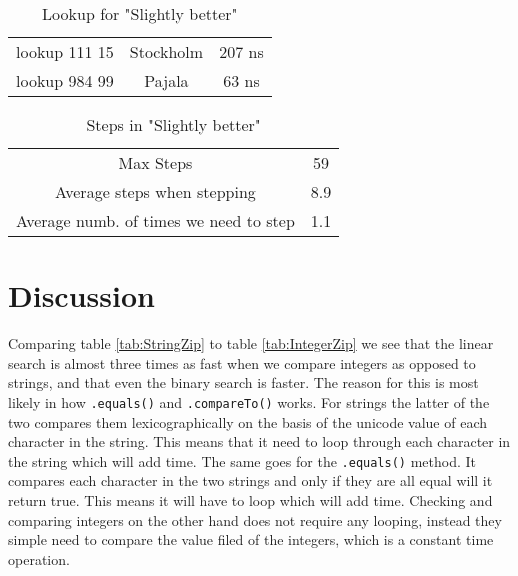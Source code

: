 \documentclass[a4paper,11pt]{article}
\begin{document}
\begin{table}[h!]
    \begin{center}
        \caption{Lookup for "Slightly better"}
        \label{tab:HashTime}
        \begin{tabular}{|c|c|c|}
            \hline
            lookup 111 15 & Stockholm & 207 ns \\
            lookup 984 99 & Pajala    & 63 ns  \\
            \hline
        \end{tabular}
    \end{center}
\end{table}
\begin{table}[h!]
    \begin{center}
        \caption{Steps in "Slightly better"}
        \label{tab:Steps}
        \begin{tabular}{|cc|}
            \hline
            Max Steps                              & 59  \\
            Average steps when stepping            & 8.9 \\
            Average numb. of times we need to step & 1.1 \\
            \hline
        \end{tabular}
    \end{center}
\end{table}

\FloatBarrier
\section{Discussion}
Comparing table \ref{tab:StringZip} to table \ref{tab:IntegerZip} we see that the linear search is almost three times as fast when we compare integers as opposed to strings,
and that even the binary search is faster. The reason for this is most likely in how {\tt .equals()} and {\tt .compareTo()} works. For strings the latter of the two compares
them lexicographically on the basis of the unicode value of each character in the string. This means that it need to loop through each character in the string which will add time.
The same goes for the {\tt .equals()} method. It compares each character in the two strings and only if they are all equal will it return true. This means it will have to loop
which will add time. Checking and comparing integers on the other hand does not require any looping, instead they simple need to compare the value filed of the integers, which
is a constant time operation.
\end{document}
